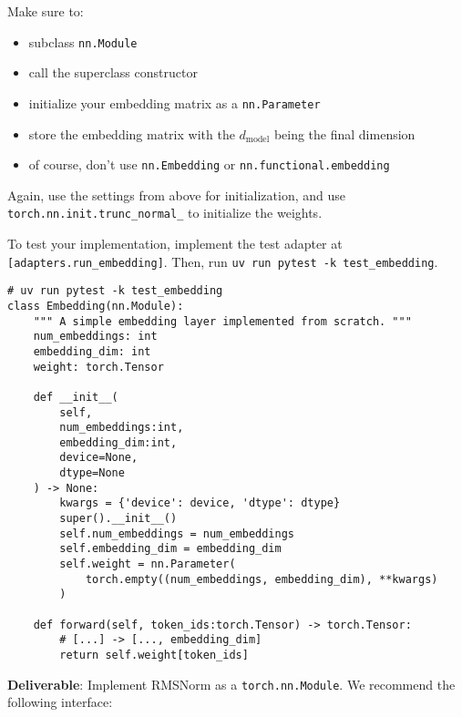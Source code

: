 Make sure to:
\begin{itemize}
    \item subclass \lstinline{nn.Module}
    \item call the superclass constructor
    \item initialize your embedding matrix as a \lstinline{nn.Parameter}
    \item store the embedding matrix with the $d_{\text{model}}$ being the final dimension
    \item of course, don't use \lstinline{nn.Embedding} or \lstinline{nn.functional.embedding}
\end{itemize}

Again, use the settings from above for initialization, and use \lstinline{torch.nn.init.trunc_normal_} to initialize the weights.

To test your implementation, implement the test adapter at \texttt{[adapters.run\_embedding]}. Then, run \texttt{uv run pytest -k test\_embedding}.

\begin{lstlisting}
# uv run pytest -k test_embedding
class Embedding(nn.Module):
    """ A simple embedding layer implemented from scratch. """
    num_embeddings: int
    embedding_dim: int
    weight: torch.Tensor
    
    def __init__(
        self, 
        num_embeddings:int, 
        embedding_dim:int, 
        device=None, 
        dtype=None
    ) -> None:
        kwargs = {'device': device, 'dtype': dtype}
        super().__init__()
        self.num_embeddings = num_embeddings
        self.embedding_dim = embedding_dim
        self.weight = nn.Parameter(
            torch.empty((num_embeddings, embedding_dim), **kwargs)
        )
    
    def forward(self, token_ids:torch.Tensor) -> torch.Tensor:
        # [...] -> [..., embedding_dim]
        return self.weight[token_ids]
\end{lstlisting}


\textbf{Deliverable}: Implement RMSNorm as a \lstinline{torch.nn.Module}. We recommend the following interface:

